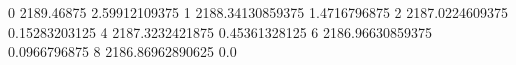 0 2189.46875 2.59912109375
1 2188.34130859375 1.4716796875
2 2187.0224609375 0.15283203125
4 2187.3232421875 0.45361328125
6 2186.96630859375 0.0966796875
8 2186.86962890625 0.0

